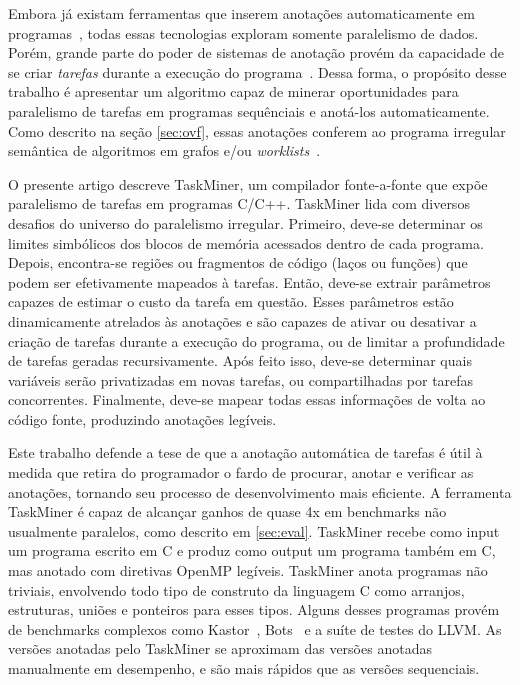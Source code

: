 \documentclass[sigplan,10pt,review]{acmart}
\newcommand\Taskminer{\mbox{\textsf{TaskMiner}}}
\begin{document}
Embora já existam ferramentas que inserem anotações automaticamente 
em programas~\cite{Mendonca16,Pingali11},
todas essas tecnologias exploram somente paralelismo de dados.  Porém, grande
parte do poder de sistemas de anotação provém da capacidade de se criar \textit{tarefas}
durante a execução do programa~\cite{Ayguade09}. Dessa forma, o propósito desse trabalho
é apresentar um algoritmo capaz de minerar oportunidades para paralelismo de tarefas
em programas sequênciais e anotá-los automaticamente. Como descrito na seção \ref{sec:ovf},
essas anotações conferem ao programa irregular semântica de algoritmos em grafos e/ou \textit{worklists}~\cite{Pingali11}.

O presente artigo descreve {\Taskminer}, um compilador fonte-a-fonte que expõe
paralelismo de tarefas em programas C/C++. {\Taskminer} lida com diversos desafios 
do universo do paralelismo irregular. Primeiro, deve-se determinar os limites
simbólicos dos blocos de memória acessados dentro de cada programa. Depois,
encontra-se regiões ou fragmentos de código (laços ou funções) que podem 
ser efetivamente mapeados à tarefas. Então, deve-se extrair parâmetros capazes
de estimar o custo da tarefa em questão. Esses parâmetros estão dinamicamente atrelados
às anotações e são capazes de ativar ou desativar a criação de tarefas durante a execução do programa,
ou de limitar a profundidade de tarefas geradas recursivamente. Após feito isso, deve-se determinar
quais variáveis serão privatizadas em novas tarefas, ou compartilhadas por tarefas concorrentes.
Finalmente, deve-se mapear todas essas informações de volta ao código fonte, produzindo
anotações legíveis.

Este trabalho defende a tese de que a anotação automática de tarefas é útil à medida que
retira do programador o fardo de procurar, anotar e verificar as anotações, tornando seu
processo de desenvolvimento mais eficiente. A ferramenta {\Taskminer} é capaz
de alcançar ganhos de quase 4x em benchmarks não usualmente paralelos, como descrito em \ref{sec:eval}. {\Taskminer}
recebe como input um programa escrito em C e produz como output um programa também em C,
mas anotado com diretivas OpenMP legíveis. {\Taskminer} anota programas não triviais, envolvendo
todo tipo de construto da linguagem C como arranjos, estruturas, uniões e ponteiros para esses tipos.
Alguns desses programas provém de benchmarks complexos como Kastor~\cite{Virouleau14}, Bots~\cite{Duran09}  e a suíte de testes do LLVM.
As versões anotadas pelo {\Taskminer} se aproximam das versões anotadas manualmente em
desempenho, e são mais rápidos que as versões sequenciais.
\end{document}
